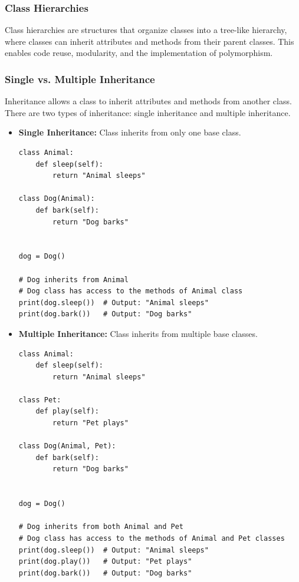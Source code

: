 \newpage
\subsubsection{Class Hierarchies}
Class hierarchies are structures that organize classes into a tree-like hierarchy, where classes can inherit attributes and methods from their parent classes. This enables code reuse, modularity, and the implementation of polymorphism.

\subsubsection{Single vs. Multiple Inheritance}
Inheritance allows a class to inherit attributes and methods from another class. There are two types of inheritance: single inheritance and multiple inheritance.\\

\begin{itemize}
\item \textbf{Single Inheritance:}
Class inherits from only one base class.\\

\begin{codebox}
\begin{verbatim}
class Animal:
    def sleep(self):
        return "Animal sleeps"

class Dog(Animal):
    def bark(self):
        return "Dog barks"


dog = Dog()

# Dog inherits from Animal
# Dog class has access to the methods of Animal class
print(dog.sleep())  # Output: "Animal sleeps"
print(dog.bark())   # Output: "Dog barks"
\end{verbatim}
\end{codebox}

\item \textbf{Multiple Inheritance:}
Class inherits from multiple base classes.\\


\begin{codebox}
\begin{verbatim}
class Animal:
    def sleep(self):
        return "Animal sleeps"

class Pet:
    def play(self):
        return "Pet plays"

class Dog(Animal, Pet):
    def bark(self):
        return "Dog barks"


dog = Dog()

# Dog inherits from both Animal and Pet
# Dog class has access to the methods of Animal and Pet classes
print(dog.sleep())  # Output: "Animal sleeps"
print(dog.play())   # Output: "Pet plays"
print(dog.bark())   # Output: "Dog barks"
\end{verbatim}
\end{codebox}
\end{itemize}

